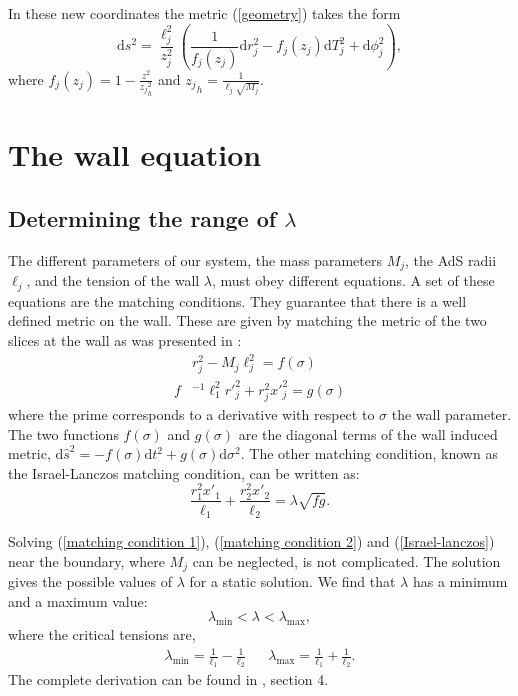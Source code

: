 In these new coordinates the metric (\ref{geometry}) takes the form
\begin{equation}\label{geometry z}
    \text{d}s^2 = \frac{\ell_j^2}{z_j^2}\left(\frac{1}{f_j(z_j)}\text{d}r_j^2 - f_j(z_j)\text{d}T_j^2+\text{d}\phi_j^2\right),
\end{equation}
where $f_j(z_j)=1-\frac{z^2}{{z_j}_h^2}$ and ${z_j}_h=\frac{1}{\ell_j\sqrt{M_j}}$.

\section{The wall equation}

\subsection{Determining the range of $\lambda$}

The different parameters of our system, the mass parameters $M_j$, the AdS radii $\ell_j$, and the tension of the wall $\lambda$, must obey different equations. A set of these equations are the matching conditions. They guarantee that there is a well defined metric on the wall. These are given by matching the metric of the two slices at the wall as was presented in \cite{Simidzija_2020,Bachas_2021}:
\begin{align}
    &r_j^2-M_j\ell_j^2=f(\sigma) \label{matching condition 1} \\
    f&^{-1}\ell_1^2r'_j^2 + r_j^2x'_j^2 = g(\sigma) \label{matching condition 2}
\end{align}
where the prime corresponds to a derivative with respect to $\sigma$ the wall parameter. The two functions $f(\sigma)$ and $g(\sigma)$ are the diagonal terms of the wall induced metric, $\text{d}\hat{s}^2=-f(\sigma)\text{d}t^2+g(\sigma)\text{d}\sigma^2$. The other matching condition, known as the Israel-Lanczos\cite{Israel:1966rt} matching condition, can be written as:
\begin{equation}\label{Israel-lanczos}
    \frac{r_1^2x'_1}{\ell_1} +  \frac{r_2^2x'_2}{\ell_2} = \lambda\sqrt{fg}.
\end{equation}

Solving (\ref{matching condition 1}), (\ref{matching condition 2}) and (\ref{Israel-lanczos}) near the boundary, where $M_j$ can be neglected, is not complicated. The solution gives the possible values of $\lambda$ for a static solution. We find that $\lambda$ has a minimum and a maximum value:
\begin{equation}\label{domain wall}
    \lambda_{\text{min}} <\lambda< \lambda_{\text{max}},
\end{equation}
where the critical tensions  are,
\begin{align}
     \lambda_{\text{min}} = \frac{1}{\ell_1} - \frac{1}{\ell_2} &&  \lambda_{\text{max}} = \frac{1}{\ell_1} + \frac{1}{\ell_2}.
\end{align}
The complete derivation can be found in \cite{Bachas_2021}, section 4.

